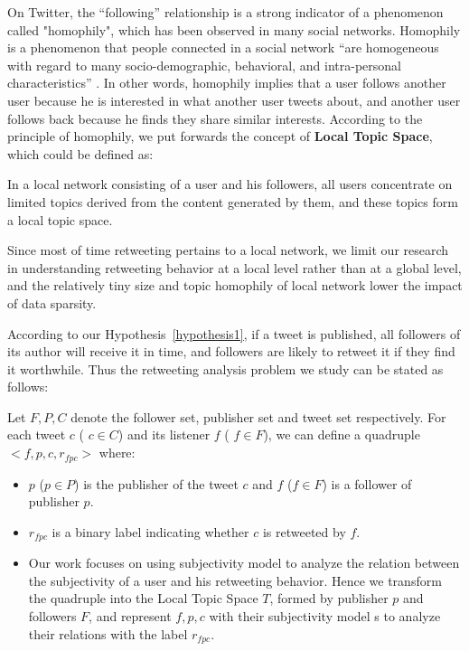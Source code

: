 \documentclass[smallcondensed]{svjour3}     %
\begin{document}
On Twitter, the ``following'' relationship is a strong indicator of a phenomenon called "homophily", which has been observed in many social networks.
Homophily is a phenomenon that people connected in a social network ``are homogeneous with regard to many socio-demographic, behavioral, and intra-personal characteristics'' \cite{mcpherson2001birds}.
In other words, homophily implies that a user follows another user because he is interested in what another user tweets about, and another user follows back because he finds they share similar interests. 
According to the principle of homophily, we put forwards the concept of \textbf{Local Topic Space}, which could be defined as:
\begin{definition}
\label{local}
In a local network consisting of a user and his followers, all users concentrate on limited topics derived from the content generated by them, and these topics form a local topic space.
\end{definition}
Since most of time retweeting pertains to a local network, we limit our research in understanding retweeting behavior at a local level rather than at a global level, and the relatively tiny size and topic homophily of local network lower the impact of data sparsity.

According to our Hypothesis~\ref{hypothesis1}, if a tweet is published, all followers of its author will receive it in time, and followers are likely to retweet it if they find it worthwhile. 
Thus the retweeting analysis problem we study can be stated as follows:

Let $ F, P, C $ denote the follower set, publisher set and tweet set respectively. 
For each tweet $c$ ( $ c \in C $) and its listener $ f $ ( $ f \in F $), we can define a quadruple $ <f, p, c, r_{fpc}>  $ where: 
\begin{itemize}
\item  $p$ ($p \in P $) is the publisher of the tweet $c$ and $f$ ($ f \in F $) is a follower of publisher $p$.
\item $ r_{fpc} $ is a binary label indicating whether $ c $ is retweeted by $ f $.
\item Our work focuses on using subjectivity model  to analyze the relation between the subjectivity of a user and his retweeting behavior. 
Hence we transform the quadruple into the Local Topic Space $ T $, formed by publisher $ p $ and followers $F $, and represent $ f, p, c $ with their subjectivity model s to analyze their relations with the label $ r_{fpc} $.
\end{itemize}
\end{document}
